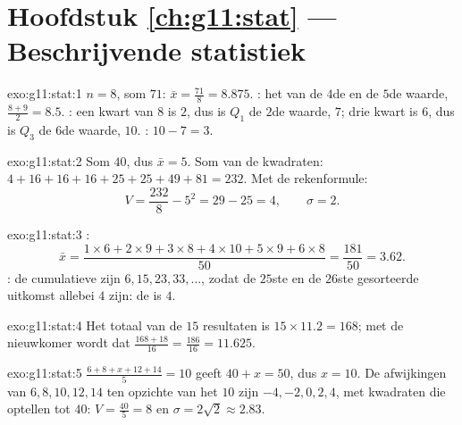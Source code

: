 \section*{Hoofdstuk \ref{ch:g11:stat} --- Beschrijvende statistiek}

\begin{solution}{exo:g11:stat:1}
$n = 8$, som $71$:  $\bar x = \frac{71}{8} = 8.875$. : het
 van de $4$de en de $5$de waarde, $\frac{8 + 9}{2} = 8.5$.
: een kwart van $8$ is $2$, dus is $Q_1$ de $2$de waarde, $7$;
drie kwart is $6$, dus is $Q_3$ de $6$de waarde, $10$.
: $10 - 7 = 3$.
\end{solution}

\begin{solution}{exo:g11:stat:2}
Som $40$, dus $\bar x = 5$. Som van de kwadraten:
$4 + 16 + 16 + 16 + 25 + 25 + 49 + 81 = 232$. Met de rekenformule:
\[
V = \frac{232}{8} - 5^2 = 29 - 25 = 4,
\qquad
\sigma = 2 .
\]
\end{solution}

\begin{solution}{exo:g11:stat:3}
:
\[
\bar x = \frac{1 \times 6 + 2 \times 9 + 3 \times 8 + 4 \times 10
+ 5 \times 9 + 6 \times 8}{50}
= \frac{181}{50} = 3.62 .
\]
: de cumulatieve  zijn $6, 15, 23, 33, \dots$, zodat de
$25$ste en de $26$ste gesorteerde uitkomst allebei $4$ zijn: de  is
$4$.
\end{solution}

\begin{solution}{exo:g11:stat:4}
Het totaal van de $15$ resultaten is $15 \times 11.2 = 168$; met de
nieuwkomer wordt dat $\frac{168 + 18}{16} = \frac{186}{16} = 11.625$.
\end{solution}

\begin{solution}{exo:g11:stat:5}
$\frac{6 + 8 + x + 12 + 14}{5} = 10$ geeft $40 + x = 50$, dus $x = 10$. De
afwijkingen van $6, 8, 10, 12, 14$ ten opzichte van het  $10$ zijn
$-4, -2, 0, 2, 4$, met kwadraten die optellen tot $40$: $V = \frac{40}{5} =
8$ en $\sigma = 2\sqrt2 \approx 2.83$.
\end{solution}

